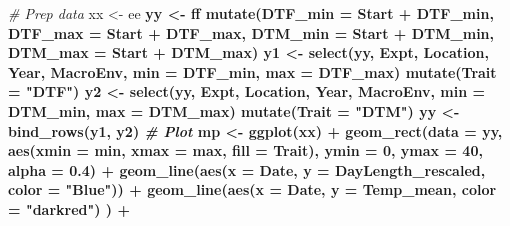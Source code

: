 \documentclass[
]{article}
\newenvironment{Shaded}{\begin{snugshade}}{\end{snugshade}}
\newcommand{\CommentTok}[1]{\textcolor[rgb]{0.56,0.35,0.01}{\textit{#1}}}
\newcommand{\DataTypeTok}[1]{\textcolor[rgb]{0.13,0.29,0.53}{#1}}
\newcommand{\DecValTok}[1]{\textcolor[rgb]{0.00,0.00,0.81}{#1}}
\newcommand{\FloatTok}[1]{\textcolor[rgb]{0.00,0.00,0.81}{#1}}
\newcommand{\KeywordTok}[1]{\textcolor[rgb]{0.13,0.29,0.53}{\textbf{#1}}}
\newcommand{\NormalTok}[1]{#1}
\newcommand{\OperatorTok}[1]{\textcolor[rgb]{0.81,0.36,0.00}{\textbf{#1}}}
\newcommand{\StringTok}[1]{\textcolor[rgb]{0.31,0.60,0.02}{#1}}
\begin{document}
\begin{Shaded}
\begin{Highlighting}[]
\CommentTok{# Prep data}
\NormalTok{xx <-}\StringTok{ }\NormalTok{ee }\OperatorTok{%
\NormalTok{yy <-}\StringTok{ }\NormalTok{ff }\OperatorTok{%
\StringTok{  }\KeywordTok{mutate}\NormalTok{(}\DataTypeTok{DTF_min =}\NormalTok{ Start }\OperatorTok{+}\StringTok{ }\NormalTok{DTF_min, }\DataTypeTok{DTF_max =}\NormalTok{ Start }\OperatorTok{+}\StringTok{ }\NormalTok{DTF_max,}
         \DataTypeTok{DTM_min =}\NormalTok{ Start }\OperatorTok{+}\StringTok{ }\NormalTok{DTM_min, }\DataTypeTok{DTM_max =}\NormalTok{ Start }\OperatorTok{+}\StringTok{ }\NormalTok{DTM_max)}
\NormalTok{y1 <-}\StringTok{ }\KeywordTok{select}\NormalTok{(yy, Expt, Location, Year, MacroEnv, }\DataTypeTok{min =}\NormalTok{ DTF_min, }\DataTypeTok{max =}\NormalTok{ DTF_max) }\OperatorTok{%
\StringTok{  }\KeywordTok{mutate}\NormalTok{(}\DataTypeTok{Trait =} \StringTok{"DTF"}\NormalTok{)}
\NormalTok{y2 <-}\StringTok{ }\KeywordTok{select}\NormalTok{(yy, Expt, Location, Year, MacroEnv, }\DataTypeTok{min =}\NormalTok{ DTM_min, }\DataTypeTok{max =}\NormalTok{ DTM_max) }\OperatorTok{%
\StringTok{  }\KeywordTok{mutate}\NormalTok{(}\DataTypeTok{Trait =} \StringTok{"DTM"}\NormalTok{)}
\NormalTok{yy <-}\StringTok{ }\KeywordTok{bind_rows}\NormalTok{(y1, y2)}
\CommentTok{# Plot}
\NormalTok{mp <-}\StringTok{ }\KeywordTok{ggplot}\NormalTok{(xx) }\OperatorTok{+}
\StringTok{  }\KeywordTok{geom_rect}\NormalTok{(}\DataTypeTok{data =}\NormalTok{ yy, }\KeywordTok{aes}\NormalTok{(}\DataTypeTok{xmin =}\NormalTok{ min, }\DataTypeTok{xmax =}\NormalTok{ max, }\DataTypeTok{fill =}\NormalTok{ Trait), }
            \DataTypeTok{ymin =} \DecValTok{0}\NormalTok{, }\DataTypeTok{ymax =} \DecValTok{40}\NormalTok{, }\DataTypeTok{alpha =} \FloatTok{0.4}\NormalTok{) }\OperatorTok{+}
\StringTok{  }\KeywordTok{geom_line}\NormalTok{(}\KeywordTok{aes}\NormalTok{(}\DataTypeTok{x =}\NormalTok{ Date, }\DataTypeTok{y =}\NormalTok{ DayLength_rescaled, }\DataTypeTok{color =} \StringTok{"Blue"}\NormalTok{)) }\OperatorTok{+}
\StringTok{  }\KeywordTok{geom_line}\NormalTok{(}\KeywordTok{aes}\NormalTok{(}\DataTypeTok{x =}\NormalTok{ Date, }\DataTypeTok{y =}\NormalTok{ Temp_mean, }\DataTypeTok{color =} \StringTok{"darkred"}\NormalTok{) ) }\OperatorTok{+}
}}}}
\end{Highlighting}
\end{Shaded}
\end{document}

